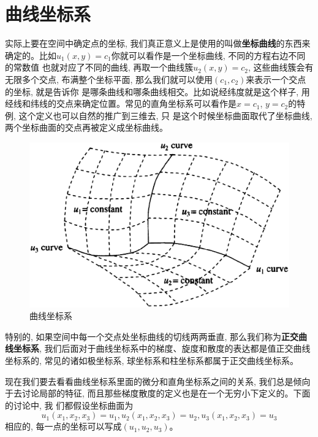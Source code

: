 \section{曲线坐标系}
实际上要在空间中确定点的坐标, 我们真正意义上是使用的叫做\textbf{坐标曲线}的东西来确定的。比如$u_1(x,y)=c_1$你就可以看作是一个坐标曲线, 不同的方程右边不同的常数值
也就对应了不同的曲线, 再取一个曲线簇$u_2(x,y)=c_2$, 这些曲线簇会有无限多个交点, 布满整个坐标平面, 那么我们就可以使用$(c_1,c_2)$来表示一个交点的坐标, 就是告诉你
是哪条曲线和哪条曲线相交。比如说经纬度就是这个样子, 用经线和纬线的交点来确定位置。常见的直角坐标系可以看作是$x=c_1$, $y=c_2$的特例, 这个定义也可以自然的推广到三维去, 只
是这个时候坐标曲面取代了坐标曲线, 两个坐标曲面的交点再被定义成坐标曲线。
\begin{figure}[htbp]
    \centering
    \includegraphics[scale=0.26]{fig/a-1.eps}
    \caption{曲线坐标系}
\end{figure}

特别的, 如果空间中每一个交点处坐标曲线的切线两两垂直, 那么我们称为\textbf{正交曲线坐标系}, 我们后面对于曲线坐标系中的梯度、旋度和散度的表达都是值正交曲线
坐标系的, 常见的诸如极坐标系, 球坐标系和柱坐标系都属于正交曲线坐标系。

现在我们要去看看曲线坐标系里面的微分和直角坐标系之间的关系, 我们总是倾向于去讨论局部的特征, 而且那些梯度散度的定义也是在一个无穷小下定义的。下面的讨论中, 我
们都假设坐标曲面为$$u_1(x_1,x_2,x_3)=u_1,u_2(x_1,x_2,x_3)=u_2,u_3(x_1,x_2,x_3)=u_3$$相应的, 每一点的坐标可以写成$(u_1,u_2,u_3)$。

